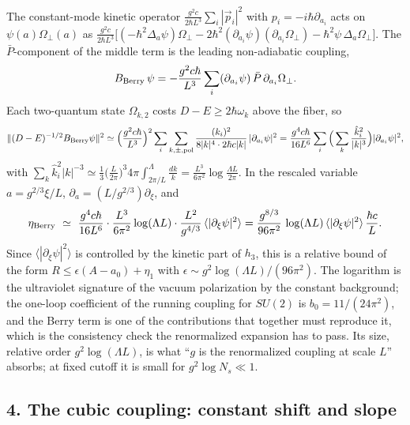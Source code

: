 \documentclass[11pt,a4paper]{article}
\begin{document}
The constant-mode kinetic operator
\(\frac{g^2c}{2\hbar L^3}\sum_i|\vec p_i|^2\) with
\(p_i=-i\hbar\partial_{a_i}\) acts on \(\psi(a)\Omega_\perp(a)\) as
\(\frac{g^2c}{2\hbar L^3}\big[(-\hbar^2\Delta_a\psi)\Omega_\perp-2\hbar^2(\partial_{a_i}\psi)(\partial_{a_i}\Omega_\perp)-\hbar^2\psi\,\Delta_a\Omega_\perp\big]\).
The \(\bar P\)-component of the middle term is the leading non-adiabatic
coupling,
\[B_{\rm Berry}\,\psi=-\frac{g^2c\hbar}{L^3}\sum_i(\partial_{a_i}\psi)\,\bar P\,\partial_{a_i}\Omega_\perp .\]
Each two-quantum state \(\Omega_{k,2}\) costs \(D-E\ge2\hbar\omega_k\)
above the fiber, so \[\|(D-E)^{-1/2}B_{\rm Berry}\psi\|^2
\simeq\Big(\frac{g^2c\hbar}{L^3}\Big)^2\sum_i\sum_{k,\pm,{\rm pol}}\frac{(k_i)^2}{8|k|^4\cdot2\hbar c|k|}\,|\partial_{a_i}\psi|^2
=\frac{g^4c\hbar}{16L^6}\sum_i\Big(\sum_k\frac{\hat k_i^2}{|k|^3}\Big)|\partial_{a_i}\psi|^2 ,\]
with
\(\sum_k\hat k_i^2|k|^{-3}\simeq\frac13\big(\frac L{2\pi}\big)^3 4\pi\int_{2\pi/L}^{\Lambda}\frac{dk}{k}=\frac{L^3}{6\pi^2}\log\frac{\Lambda L}{2\pi}\).
In the rescaled variable \(a=g^{2/3}\xi/L\),
\(\partial_a=(L/g^{2/3})\partial_\xi\), and
\[\eta_{\rm Berry}\ \simeq\ \frac{g^4c\hbar}{16L^6}\cdot\frac{L^3}{6\pi^2}\log(\Lambda L)\cdot\frac{L^2}{g^{4/3}}\,\langle|\partial_\xi\psi|^2\rangle
=\frac{g^{8/3}}{96\pi^2}\,\log(\Lambda L)\,\langle|\partial_\xi\psi|^2\rangle\,\frac{\hbar c}{L}.\]
Since \(\langle|\partial_\xi\psi|^2\rangle\) is controlled by the
kinetic part of \(h_3\), this is a relative bound of the form
\(R\le\epsilon(A-a_0)+\eta_1\) with
\(\epsilon\sim g^2\log(\Lambda L)/(96\pi^2)\). The logarithm is the
ultraviolet signature of the vacuum polarization by the constant
background; the one-loop coefficient of the running coupling for
\(SU(2)\) is \(b_0=11/(24\pi^2)\), and the Berry term is one of the
contributions that together must reproduce it, which is the consistency
check the renormalized expansion has to pass. Its size, relative order
\(g^2\log(\Lambda L)\), is what ``\(g\) is the renormalized coupling at
scale \(L\)'' absorbs; at fixed cutoff it is small for
\(g^2\log N_s\ll1\).

\hypertarget{the-cubic-coupling-constant-shift-and-slope}{%
\subsection{4. The cubic coupling: constant shift and
slope}\label{the-cubic-coupling-constant-shift-and-slope}}
\end{document}
